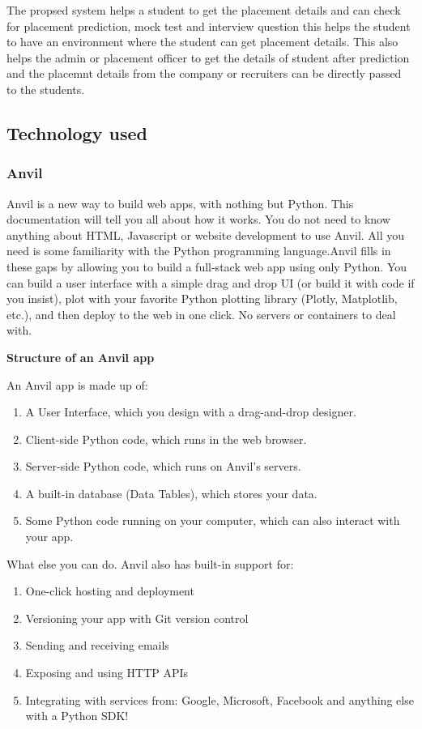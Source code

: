 \documentclass[12pt]{article}
\begin{document}
The propsed system helps a student to get the placement details and can check for placement prediction, mock test and interview question this helps the student to have an environment where the student can get placement details. This also helps the admin or placement officer to get the details of student after prediction and the placemnt details from the company or recruiters can be directly passed to the students. 

\subsection{Technology used}
\subsubsection{Anvil}
Anvil is a new way to build web apps, with nothing but Python. This documentation will tell you all about how it works.
You do not need to know anything about HTML, Javascript or website development to use Anvil. All you need is some familiarity with the Python programming language.Anvil fills in these gaps by allowing you to build a full-stack web app using only Python. You can build a user interface with a simple drag and drop UI (or build it with code if you insist), plot with your favorite Python plotting library (Plotly, Matplotlib, etc.), and then deploy to the web in one click. No servers or containers to deal with.

\textbf{Structure of an Anvil app}

An Anvil app is made up of:
\begin{enumerate}
\item A User Interface, which you design with a drag-and-drop designer.
\item Client-side Python code, which runs in the web browser.
\item Server-side Python code, which runs on Anvil’s servers.
\item A built-in database (Data Tables), which stores your data.
\item Some Python code running on your computer, which can also interact with your app.
\end{enumerate}
What else you can do. Anvil also has built-in support for:
\begin{enumerate}
\item One-click hosting and deployment
\item Versioning your app with Git version control
\item Sending and receiving emails
\item Exposing and using HTTP APIs
\item Integrating with services from: Google, Microsoft, Facebook and anything else with a Python SDK!
\end{enumerate}
\end{document}

